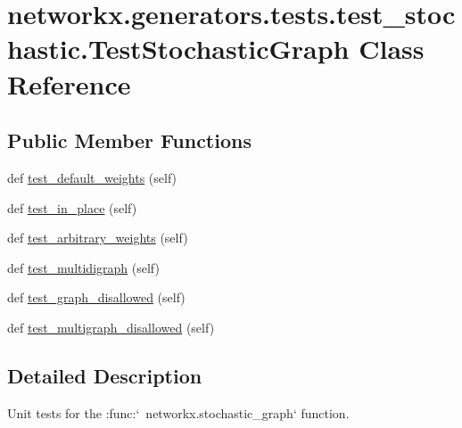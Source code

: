 \hypertarget{classnetworkx_1_1generators_1_1tests_1_1test__stochastic_1_1TestStochasticGraph}{}\section{networkx.\+generators.\+tests.\+test\+\_\+stochastic.\+Test\+Stochastic\+Graph Class Reference}
\label{classnetworkx_1_1generators_1_1tests_1_1test__stochastic_1_1TestStochasticGraph}
\subsection*{Public Member Functions}
\begin{DoxyCompactItemize}
\item 
def \hyperlink{classnetworkx_1_1generators_1_1tests_1_1test__stochastic_1_1TestStochasticGraph_ae7cce536a3d370302a09e24a7aa6ccb9}{test\+\_\+default\+\_\+weights} (self)
\item 
def \hyperlink{classnetworkx_1_1generators_1_1tests_1_1test__stochastic_1_1TestStochasticGraph_a6cd8e5b998b6cadd0830a5fb4fef5739}{test\+\_\+in\+\_\+place} (self)
\item 
def \hyperlink{classnetworkx_1_1generators_1_1tests_1_1test__stochastic_1_1TestStochasticGraph_a51bb0a2ee1741bc1554ccbe57e13dd89}{test\+\_\+arbitrary\+\_\+weights} (self)
\item 
def \hyperlink{classnetworkx_1_1generators_1_1tests_1_1test__stochastic_1_1TestStochasticGraph_ac15f13e0cabd405f61c7ff2fafdf8abe}{test\+\_\+multidigraph} (self)
\item 
def \hyperlink{classnetworkx_1_1generators_1_1tests_1_1test__stochastic_1_1TestStochasticGraph_aa2aa6eac8dbbad48d559743e32c892a0}{test\+\_\+graph\+\_\+disallowed} (self)
\item 
def \hyperlink{classnetworkx_1_1generators_1_1tests_1_1test__stochastic_1_1TestStochasticGraph_a69ce5279f400141960448fd895f84d36}{test\+\_\+multigraph\+\_\+disallowed} (self)
\end{DoxyCompactItemize}


\subsection{Detailed Description}
\begin{DoxyVerb}Unit tests for the :func:`~networkx.stochastic_graph` function.\end{DoxyVerb}
 

